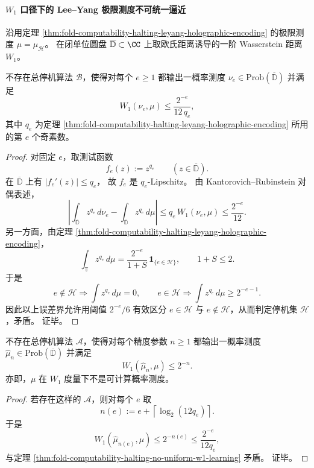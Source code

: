 \paragraph{\texorpdfstring{$W_1$}{W1} 口径下的 Lee--Yang 极限测度不可统一逼近}
沿用定理 \ref{thm:fold-computability-halting-leyang-holographic-encoding} 的极限测度
\(
\mu=\mu_{\mathcal H}
\)。
在闭单位圆盘 \(\overline{\mathbb D}\subset\CC\) 上取欧氏距离诱导的一阶 Wasserstein 距离 \(W_1\)。

\begin{theorem}\label{thm:fold-computability-halting-no-uniform-w1-learning}
不存在总停机算法 \(\mathcal B\)，使得对每个 \(e\ge 1\) 都输出一概率测度 \(\nu_e\in\mathrm{Prob}(\overline{\mathbb D})\) 并满足
\[
W_1(\nu_e,\mu)\le \frac{2^{-e}}{12\,q_e},
\]
其中 \(q_e\) 为定理 \ref{thm:fold-computability-halting-leyang-holographic-encoding} 所用的第 \(e\) 个奇素数。
\end{theorem}
\begin{proof}
对固定 \(e\)，取测试函数
\[
f_e(z):=z^{q_e}\qquad(z\in\overline{\mathbb D}).
\]
在 \(\overline{\mathbb D}\) 上有
\(
|f_e'(z)|\le q_e
\)，
故 \(f_e\) 是 \(q_e\)-Lipschitz。
由 Kantorovich--Rubinstein 对偶表述，
\[
\left|\int_{\overline{\mathbb D}} z^{q_e}\,d\nu_e-\int_{\overline{\mathbb D}} z^{q_e}\,d\mu\right|
\le q_e\,W_1(\nu_e,\mu)
\le \frac{2^{-e}}{12}.
\]
另一方面，由定理 \ref{thm:fold-computability-halting-leyang-holographic-encoding}，
\[
\int_{\mathbb T} z^{q_e}\,d\mu=
\frac{2^{-e}}{1+S}\,\mathbf 1_{\{e\in\mathcal H\}},
\qquad
1+S\le 2.
\]
于是
\[
e\notin\mathcal H
\Longrightarrow
\int z^{q_e}\,d\mu=0,
\qquad
e\in\mathcal H
\Longrightarrow
\int z^{q_e}\,d\mu\ge 2^{-e-1}.
\]
因此以上误差界允许用阈值 \(2^{-e}/6\) 有效区分 \(e\in\mathcal H\) 与 \(e\notin\mathcal H\)，从而判定停机集 \(\mathcal H\)，矛盾。
证毕。
\end{proof}

\begin{corollary}\label{cor:fold-computability-halting-measure-not-w1-computable}
不存在总停机算法 \(\mathcal A\)，使得对每个精度参数 \(n\ge 1\) 都输出一概率测度 \(\widehat\mu_n\in\mathrm{Prob}(\overline{\mathbb D})\) 并满足
\[
W_1(\widehat\mu_n,\mu)\le 2^{-n}.
\]
亦即，\(\mu\) 在 \(W_1\) 度量下不是可计算概率测度。
\end{corollary}
\begin{proof}
若存在这样的 \(\mathcal A\)，则对每个 \(e\) 取
\[
n(e):=e+\left\lceil \log_2(12q_e)\right\rceil.
\]
于是
\[
W_1(\widehat\mu_{n(e)},\mu)\le 2^{-n(e)}\le \frac{2^{-e}}{12q_e},
\]
与定理 \ref{thm:fold-computability-halting-no-uniform-w1-learning} 矛盾。
证毕。
\end{proof}

\endinput
